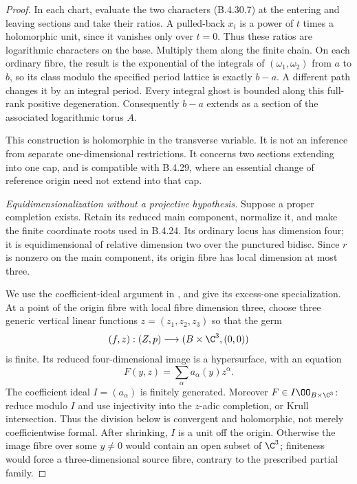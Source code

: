 \begin{proof}
In each chart, evaluate the two characters
(B.4.30.7) at the entering and leaving sections
and take their ratios. A pulled-back $x_i$
is a power of $t$ times a holomorphic unit,
since it vanishes only over $t=0$. Thus these
ratios are logarithmic characters on the base.
Multiply them along the finite chain. On each
ordinary fibre, the result is the exponential
of the integrals of $(\omega_1,\omega_2)$ from
$a$ to $b$, so its class modulo the specified
period lattice is exactly $b-a$. A different
path changes it by an integral period. Every
integral ghost is bounded along this full-rank
positive degeneration. Consequently $b-a$
extends as a section of the associated
logarithmic torus $A$.

This construction is holomorphic in the
transverse variable. It is not an inference
from separate one-dimensional restrictions.
It concerns two sections extending into one
cap, and is compatible with B.4.29, where an
essential change of reference origin need not
extend into that cap.

\emph{Equidimensionalization without a projective hypothesis.}
Suppose a proper completion exists. Retain its
reduced main component, normalize it, and make
the finite coordinate roots used in B.4.24.
Its ordinary locus has dimension four; it is
equidimensional of relative dimension two
over the punctured bidisc. Since $r$ is
nonzero on the main component, its origin
fibre has local dimension at most three.

We use the coefficient-ideal argument in
\citet[Corollary 1.2 and its proof,
manuscript pp.~3--5]{Parusinski1990E}, and give
its excess-one specialization. At a point of
the origin fibre with local fibre dimension
three, choose three generic vertical linear
functions $z=(z_1,z_2,z_3)$ so that the germ
\[
 (f,z): (Z,p)\longrightarrow(B\times\C^3,(0,0))
\]
is finite. Its reduced four-dimensional image
is a hypersurface, with an equation
\[
 F(y,z)=\sum_\alpha a_\alpha(y)z^\alpha.
 \tag{B.4.30.8}
\]
The coefficient ideal $I=(a_\alpha)$ is finitely
generated. Moreover $F\in I\OO_{B\times\C^3}$:
reduce modulo $I$ and use injectivity into
the $z$-adic completion, or Krull intersection.
Thus the division below is convergent and
holomorphic, not merely coefficientwise formal.
After shrinking, $I$ is a unit off the origin. Otherwise the image fibre over
some $y\ne0$ would contain an open subset of
$\C^3$; finiteness would force a
three-dimensional source fibre, contrary to
the prescribed partial family.


\end{proof}

